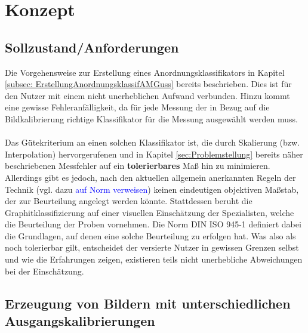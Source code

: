\documentclass[
fontsize=10pt, 
listof = totoc,
parskip = half	
]{report}
\begin{document}
\chapter{Konzept}
\label{ch:Konzept}

\section{Sollzustand/Anforderungen}
\label{sec:DefAnforderungenAnordnKlas}
Die Vorgehensweise zur Erstellung eines Anordnungsklassifikators in Kapitel \ref{subsec: ErstellungAnordnungsklassifAMGuss} bereits beschrieben. Dies ist für den Nutzer mit einem nicht unerheblichen Aufwand verbunden. Hinzu kommt eine gewisse Fehleranfälligkeit, da für jede Messung der in Bezug auf die Bildkalibrierung richtige Klassifikator für die Messung ausgewählt werden muss.
\\\\
\noindent Das Gütekriterium an einen solchen Klassifikator ist, die durch Skalierung (bzw. Interpolation) hervorgerufenen und in Kapitel \ref{sec:Problemstellung} bereits näher beschriebenen Messfehler auf ein \textbf{tolerierbares} Maß hin zu minimieren. Allerdings gibt es jedoch, nach den aktuellen allgemein anerkannten Regeln der Technik (vgl. dazu \textcolor{blue}{auf Norm verweisen}) keinen eindeutigen objektiven Maßstab, der zur Beurteilung angelegt werden könnte. Stattdessen beruht die Graphitklassifizierung auf einer visuellen Einschätzung der Spezialisten, welche die Beurteilung der Proben vornehmen. Die Norm DIN ISO 945-1 definiert dabei die Grundlagen, auf denen eine solche Beurteilung zu erfolgen hat. Was also als noch tolerierbar gilt, entscheidet der versierte Nutzer in gewissen Grenzen selbst und wie die Erfahrungen zeigen, existieren teils nicht unerhebliche Abweichungen bei der Einschätzung. 

\section{Erzeugung von Bildern mit unterschiedlichen Ausgangskalibrierungen}
\end{document}
